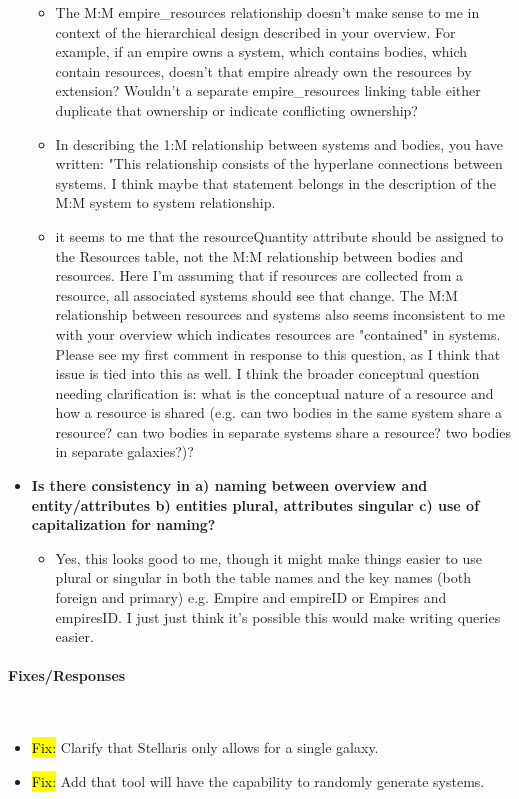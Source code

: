 \documentclass[12pt]{article}
\newcommand{\hiparagraph}[1]{\paragraph{#1}\mbox{}\vspace{-2em}\\}
\DeclareRobustCommand{\fix}[1]{{\sethlcolor{YellowGreen}\hl{Fix:} #1}}
\begin{document}
\begin{appendices}
\begin{itemize}
\begin{itemize}
        \item The M:M empire\_resources relationship doesn't make sense to me in context of the hierarchical design described in your overview. For example, if an empire owns a system, which contains bodies, which contain resources, doesn't that empire already own the resources by extension? Wouldn't a separate empire\_resources linking table either duplicate that ownership or indicate conflicting ownership?
        \item In describing the 1:M relationship between systems and bodies, you have written: "This relationship consists of the hyperlane connections between systems. I think maybe that statement belongs in the description of the M:M system to system relationship.
        \item it seems to me that the resourceQuantity attribute should be assigned to the Resources table, not the M:M relationship between bodies and resources. Here I'm assuming that if resources are collected from a resource, all associated systems should see that change. The M:M relationship between resources and systems also seems inconsistent to me with your overview which indicates resources are "contained" in systems. Please see my first comment in response to this question, as I think that issue is tied into this as well. I think the broader conceptual question needing clarification is: what is the conceptual nature of a resource and how a resource is shared (e.g. can two bodies in the same system share a resource? can two bodies in separate systems share a resource? two bodies in separate galaxies?)?
    \end{itemize}
    \item \textbf{Is there consistency in a) naming between overview and entity/attributes b) entities plural, attributes singular c) use of capitalization for naming?}
    \begin{itemize}
        \item Yes, this looks good to me, though it might make things easier to use plural or singular in both the table names and the key names (both foreign and primary) e.g. Empire and empireID or Empires and empiresID. I just just think it's possible this would make writing queries easier.
    \end{itemize}
\end{itemize}
\hiparagraph{Fixes/Responses}
\begin{itemize}
    \item \fix{Clarify that Stellaris only allows for a single galaxy.}
    \item \fix{Add that tool will have the capability to randomly generate systems.}

\end{itemize}
\end{appendices}
\end{document}
